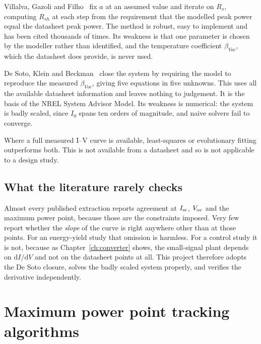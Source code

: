 \begin{description}[leftmargin=0pt, style=unboxed]
\item[Fix the ideality factor and iterate.] Villalva, Gazoli and
  Filho~\cite{villalva} fix $a$ at an assumed value and iterate on $R_s$,
  computing $R_{sh}$ at each step from the requirement that the modelled peak
  power equal the datasheet peak power. The method is robust, easy to implement
  and has been cited thousands of times. Its weakness is that one parameter is
  chosen by the modeller rather than identified, and the temperature coefficient
  $\beta_{Voc}$, which the datasheet does provide, is never used.
\item[Solve a determined system.] De Soto, Klein and Beckman~\cite{desoto} close
  the system by requiring the model to reproduce the measured $\beta_{Voc}$,
  giving five equations in five unknowns. This uses all the available datasheet
  information and leaves nothing to judgement. It is the basis of the NREL
  System Advisor Model. Its weakness is numerical: the system is badly scaled,
  since $I_0$ spans ten orders of magnitude, and naive solvers fail to converge.
\item[Fit to measured curves.] Where a full measured I--V curve is available,
  least-squares or evolutionary fitting outperforms both. This is not available
  from a datasheet and so is not applicable to a design study.
\end{description}

\subsection{What the literature rarely checks}

Almost every published extraction reports agreement at $I_{\mathrm{sc}}$, $V_{\mathrm{oc}}$ and the
maximum power point, because those are the constraints imposed. Very few report
whether the \emph{slope} of the curve is right anywhere other than at those
points. For an energy-yield study that omission is harmless. For a control
study it is not, because as Chapter~\ref{ch:converter} shows, the small-signal
plant depends on $\mathrm{d}I/\mathrm{d}V$ and not on the datasheet points at
all. This project therefore adopts the De Soto closure, solves the badly scaled
system properly, and verifies the derivative independently.

\section{Maximum power point tracking algorithms}

